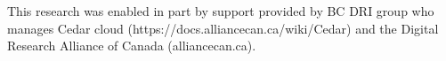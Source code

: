 \documentclass[10pt,letterpaper]{article}
\begin{document}
This research was enabled in part by support provided by 
BC DRI group who manages Cedar cloud (https://docs.alliancecan.ca/wiki/Cedar)
and the Digital Research Alliance of Canada (alliancecan.ca).

\nolinenumbers

%
%
% 


 


\end{document}
